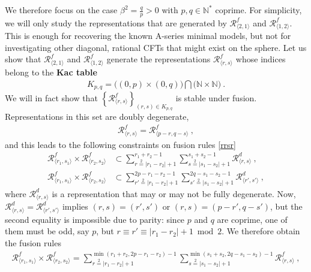 \documentclass[12pt, a4paper]{article}
\newcommand{\myindex}[1]{\textbf{\boldmath #1}}
\begin{document}
We therefore focus on the case $\beta^2 = \frac{q}{p}>0$ with $p,q\in\mathbb{N}^*$ coprime. For simplicity, we will only study the representations that are generated by $\mathcal{R}^f_{\langle 2,1\rangle}$ and $\mathcal{R}^f_{\langle 1,2\rangle}$. This is enough for recovering the known A-series minimal models, but not for investigating other diagonal, rational CFTs that might exist on the sphere. 
Let us show that $\mathcal{R}^f_{\langle 2,1\rangle}$ and $\mathcal{R}^f_{\langle 1,2\rangle}$ generate the representations $\mathcal{R}^f_{\langle r,s\rangle}$  whose indices belong to the \myindex{Kac table}
\begin{align}
 \boxed{ K_{p, q}=  \big((0,p)\times (0,q)\big)\bigcap \big(\mathbb{N}\times \mathbb{N}\big) }\ .
 \label{kac}
\end{align}
We will in fact show that $\left\{\mathcal{R}^f_{\langle r,s\rangle}\right\}_{(r,s)\in K_{p, q}}$ is stable under fusion. Representations in this set are doubly degenerate, 
\begin{align}
 \mathcal{R}^f_{\langle r,s\rangle} = \mathcal{R}^f_{\langle p-r,q-s\rangle}\ , 
 \label{prqs}
\end{align}
and this leads to the following constraints on fusion rules \eqref{rrsr}
\begin{subequations}
\begin{align}
 \mathcal{R}^f_{\langle r_1,s_1\rangle} \times \mathcal{R}^f_{\langle r_2,s_2\rangle} &\subset \sum_{r\overset{2}{=} |r_1-r_2|+1}^{r_1+r_2-1}\sum_{s\overset{2}{=} |s_1-s_2|+1}^{s_1+s_2-1} \mathcal{R}^d_{\langle r,s\rangle} \ , 
 \\
 \mathcal{R}^f_{\langle r_1,s_1\rangle} \times \mathcal{R}^f_{\langle r_2,s_2\rangle} &\subset \sum_{r'\overset{2}{=} |r_1-r_2|+1}^{2p-r_1-r_2-1} \sum_{s'\overset{2}{=} |s_1-s_2|+1}^{2q-s_1-s_2-1}\mathcal{R}^d_{\langle r',s'\rangle} \ , 
\end{align}
\end{subequations}
where $\mathcal{R}^d_{\langle r,s\rangle}$ is a representation that may or may not be fully degenerate. Now, $\mathcal{R}^d_{\langle r,s\rangle} = \mathcal{R}^d_{\langle r',s'\rangle}$ implies $(r,s)=(r',s')$ or $(r,s)=(p-r',q-s')$, but the second equality is impossible due to parity: since $p$ and $q$ are coprime, one of them must be odd, say $p$, but $r\equiv r'\equiv |r_1-r_2|+1\bmod 2$. We therefore obtain the fusion rules 
\begin{align}
 \boxed{\mathcal{R}^f_{\langle r_1,s_1\rangle} \times \mathcal{R}^f_{\langle r_2,s_2\rangle} = \sum_{r\overset{2}{=} |r_1-r_2|+1}^{\min(r_1+r_2,2p-r_1-r_2)-1}\sum_{s\overset{2}{=} |s_1-s_2|+1}^{\min(s_1+s_2,2q-s_1-s_2)-1} \mathcal{R}^f_{\langle r,s\rangle}} \ , 
 \label{rfrf}
\end{align}
\end{document}
